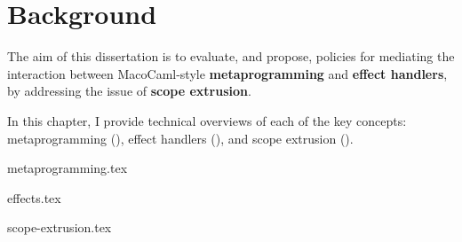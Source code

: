 
\chapter{Background}
The aim of this dissertation is to evaluate, and propose, policies for mediating the interaction between MacoCaml-style \textbf{metaprogramming} and \textbf{effect handlers}, by addressing the issue of \textbf{scope extrusion}.

In this chapter, I provide technical overviews of each of the key concepts: metaprogramming (), effect handlers (), and scope extrusion ().

{metaprogramming.tex}

{effects.tex}

{scope-extrusion.tex}

